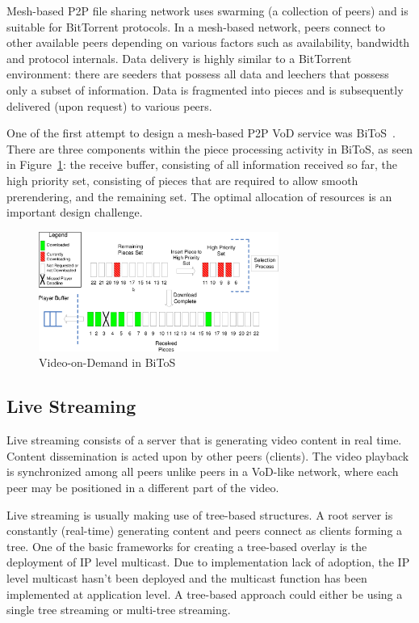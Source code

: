 Mesh-based P2P file sharing network uses swarming (a collection of peers) and
is suitable for BitTorrent protocols. In a mesh-based network, peers connect
to other available peers depending on various factors such as availability,
bandwidth and protocol internals. Data delivery is highly similar to a
BitTorrent environment: there are seeders that possess all data and leechers
that possess only a subset of information. Data is fragmented into pieces and
is subsequently delivered (upon request) to various peers.

One of the first attempt to design a mesh-based P2P VoD service was
BiToS~\cite{bitos}. There are three components within the piece processing
activity in BiToS, as seen in Figure~\ref{fig:p2p-systems:bitos-vod}: the
receive buffer, consisting of all information received so far, the high
priority set, consisting of pieces that are required to allow smooth
prerendering, and the remaining set. The optimal allocation of resources is an
important design challenge.

\begin{figure}
  \centering
  \includegraphics[width=0.7\textwidth]{src/img/p2p-systems/bitos-vod}
  \caption{Video-on-Demand in BiToS~\cite{bitos}}
  \label{fig:p2p-systems:bitos-vod}
\end{figure}

\subsection{Live Streaming}
\label{subsec:p2p-systems:ls}

Live streaming consists of a server that is generating video content in real
time. Content dissemination is acted upon by other peers (clients). The video
playback is synchronized among all peers unlike peers in a VoD-like network,
where each peer may be positioned in a different part of the video.

Live streaming is usually making use of tree-based structures. A root server
is constantly (real-time) generating content and peers connect as clients
forming a tree. One of the basic frameworks for creating a tree-based overlay
is the deployment of IP level multicast. Due to implementation lack of
adoption, the IP level multicast hasn't been deployed and the multicast
function has been implemented at application level. A tree-based approach
could either be using a single tree streaming or multi-tree streaming.

